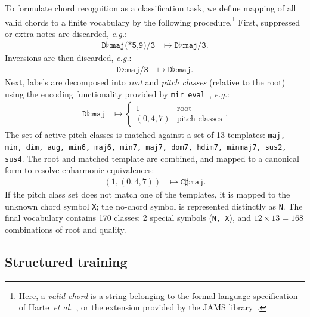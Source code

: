 \documentclass{article}
\def\eg{\emph{e.g.\/}}
\begin{document}
To formulate chord recognition as a classification task, we define mapping of all valid chords to a finite vocabulary by the following procedure.\footnote{Here, a \emph{valid chord} is a string belonging to the formal language specification of Harte~\emph{et al.}~\cite{harte2005symbolic}, or the extension provided by the JAMS library~\cite{humphrey2014jams}.}
First, suppressed or extra notes are discarded, \eg:
\begin{align*}
    \texttt{D}\flat\texttt{:maj(*5,9)/3} &\mapsto \texttt{D}\flat\texttt{:maj/3}.
\end{align*}
Inversions are then discarded, \eg:
\begin{align*}
    \texttt{D}\flat\texttt{:maj/3} &\mapsto \texttt{D}\flat\texttt{:maj}.
\end{align*}
Next, labels are decomposed into \emph{root} and \emph{pitch classes} (relative to the root) using the encoding functionality provided by \texttt{mir\_eval}~\cite{raffel2014mir_eval}, \eg:
\begin{align*}
    \texttt{D}\flat\texttt{:maj} &\mapsto \begin{cases}
        1 & \text{root}\\
        (0, 4, 7) & \text{pitch classes}
    \end{cases}.
\end{align*}
The set of active pitch classes is matched against a set of 13 templates: \texttt{maj, min, dim, aug, min6, maj6, min7, maj7, dom7, hdim7, minmaj7, sus2, sus4}.
The root and matched template are combined, and mapped to a canonical form to resolve enharmonic equivalences:
\begin{align*}
    \left(1, (0, 4, 7) \right) &\mapsto \texttt{C}\sharp\texttt{:maj}.
\end{align*}
If the pitch class set does not match one of the templates, it is mapped to the unknown chord symbol \texttt{X}; the no-chord symbol is represented distinctly as \texttt{N}.
The final vocabulary contains 170 classes: 2 special symbols (\texttt{N, X}), and $12\times13=168$ combinations of root and quality.


\subsection{Structured training}


%       
\end{document}
